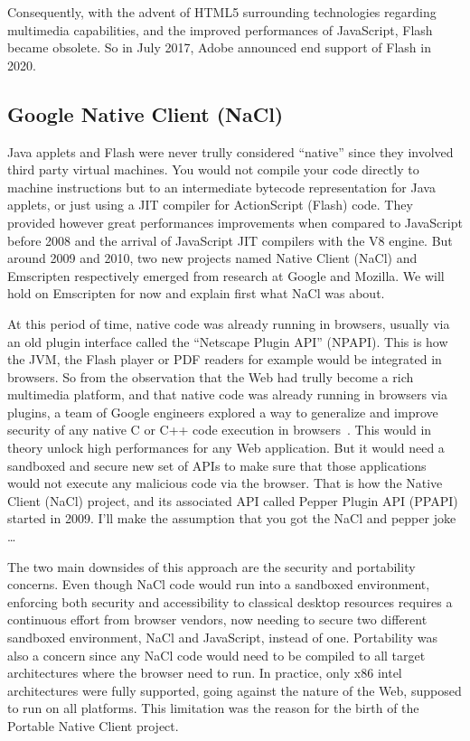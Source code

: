 Consequently, with the advent of HTML5 surrounding technologies regarding multimedia capabilities,
and the improved performances of JavaScript, Flash became obsolete.
So in July 2017, Adobe announced end support of Flash in 2020.

\subsection{Google Native Client (NaCl)}%
\label{sub:nacl}

Java applets and Flash were never trully considered ``native''
since they involved third party virtual machines.
You would not compile your code directly to machine instructions
but to an intermediate bytecode representation for Java applets,
or just using a JIT compiler for ActionScript (Flash) code.
They provided however great performances improvements when compared
to JavaScript before 2008 and the arrival of JavaScript JIT compilers with the V8 engine.
But around 2009 and 2010, two new projects named Native Client (NaCl) and Emscripten
respectively emerged from research at Google and Mozilla.
We will hold on Emscripten for now and explain first what NaCl was about.

At this period of time, native code was already running in browsers,
usually via an old plugin interface called the ``Netscape Plugin API'' (NPAPI).
This is how the JVM, the Flash player or PDF readers for example
would be integrated in browsers.
So from the observation that the Web had trully become a rich multimedia platform,
and that native code was already running in browsers via plugins,
a team of Google engineers explored a way to generalize and improve security
of any native C or C++ code execution in browsers~\cite{yee2009native}.
This would in theory unlock high performances for any Web application.
But it would need a sandboxed and secure new set of APIs
to make sure that those applications would not execute any malicious code via the browser.
That is how the Native Client (NaCl) project,
and its associated API called Pepper Plugin API (PPAPI) started in 2009.
I'll make the assumption that you got the NaCl and pepper joke \ldots

The two main downsides of this approach are the security and portability concerns.
Even though NaCl code would run into a sandboxed environment,
enforcing both security and accessibility to classical desktop resources
requires a continuous effort from browser vendors,
now needing to secure two different sandboxed environment,
NaCl and JavaScript, instead of one.
Portability was also a concern since any NaCl code would need to be compiled
to all target architectures where the browser need to run.
In practice, only x86 intel architectures were fully supported,
going against the nature of the Web, supposed to run on all platforms.
This limitation was the reason for the birth of the Portable Native Client project.

